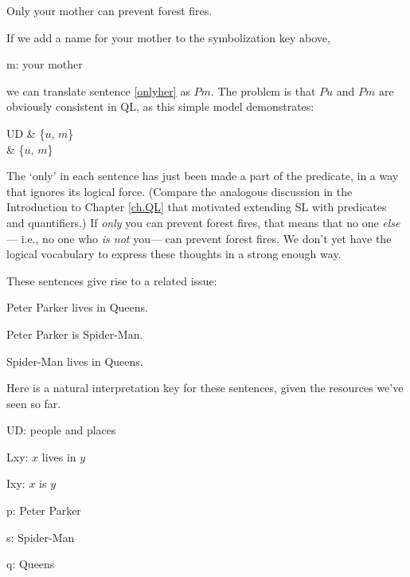 \begin{earg}
\item[\ex{onlyher}] Only your mother can prevent forest fires.
\end{earg}

If we add a name for your mother to the symbolization key above,

\begin{ekey}
\item[m:] your mother
\end{ekey}

we can translate sentence \ref{onlyher} as $Pm$. The problem is that $Pu$ and $Pm$ are obviously consistent in QL, as this simple model demonstrates:

\begin{partialmodel}
	UD & \{$u$, $m$\}\\
	 & \{$u$, $m$\}
\end{partialmodel}

The `only' in each sentence has just been made a part of the predicate, in a way that ignores its logical force. (Compare the analogous discussion in the Introduction to Chapter \ref{ch.QL} that motivated extending SL with predicates and quantifiers.) If \emph{only} you can prevent forest fires, that means that no one \emph{else}--- i.e., no one who \emph{is not} you--- can prevent forest fires. We don't yet have the logical vocabulary to express these thoughts in a strong enough way.

These sentences give rise to a related issue:

\begin{earg}
\item[\ex{ppq}] Peter Parker lives in Queens.
\item[\ex{pps}] Peter Parker is Spider-Man.
\item[\ex{sq}] Spider-Man lives in Queens.
\end{earg}

Here is a natural interpretation key for these sentences, given the resources we've seen so far.

\begin{ekey}
\item[UD:] people and places
\item[Lxy:] $x$ lives in $y$
\item[Ixy:] $x$ is $y$
\item[p:] Peter Parker
\item[s:] Spider-Man
\item[q:] Queens
\end{ekey}

